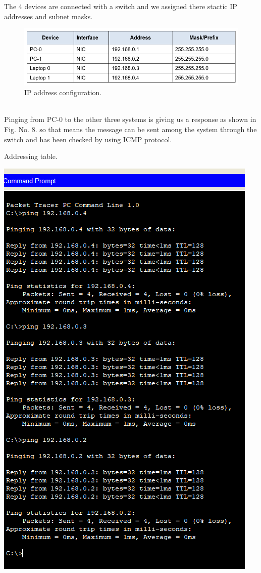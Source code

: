 \documentclass[12pt,a4paper]{article}
\begin{document}
The 4 devices are connected with a switch and we assigned there stactic IP addresses   and subnet masks.
\begin{figure}[h]
 		\centering
				\includegraphics[scale=0.75]{3.2.png}	


			\caption{IP address configuration.}
			\label{fig:AP}
	\end{figure}
\\Pinging from PC-0 to the other three systems is giving us a response as shown in Fig. No. 8. so that means the message can be sent among the system through the switch and has been checked by using ICMP protocol.
\begin{table}[h!]
\begin{center}
\centering
\caption{Addressing table.}
\includegraphics[scale=0.75]{3.3.png}	
\end{center}
\end{table}
\pagebreak
\end{document}
